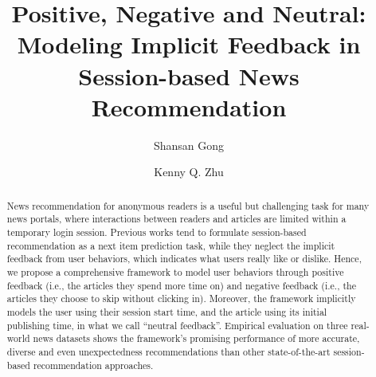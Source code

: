 \documentclass[sigconf]{acmart}
\begin{document}
\fancyhead{}

\title{Positive, Negative and Neutral: Modeling Implicit Feedback in 
Session-based News Recommendation}

\author{Shansan Gong}

\author{Kenny Q. Zhu}


\begin{abstract}
  News recommendation for anonymous readers is a useful but challenging task for many news portals, where interactions between readers and articles 
  are limited within a temporary login session. 
  Previous works tend to formulate session-based recommendation as 
  a next item prediction task, while they neglect the implicit feedback from 
  user behaviors, which indicates what users really like or dislike. 
  Hence, we propose a comprehensive framework to model user behaviors
  through positive feedback (i.e., the articles they spend more time on) and
  negative feedback (i.e., the articles they choose to skip without clicking in).
  Moreover, the framework implicitly models the user using their session start time, and the article using its initial publishing time, in what we call ``neutral
  feedback''.
  Empirical evaluation on three real-world news datasets shows 
  the framework's promising performance of more accurate, diverse and even 
  unexpectedness recommendations than other state-of-the-art 
  session-based recommendation approaches.
\end{abstract}
\end{document}
